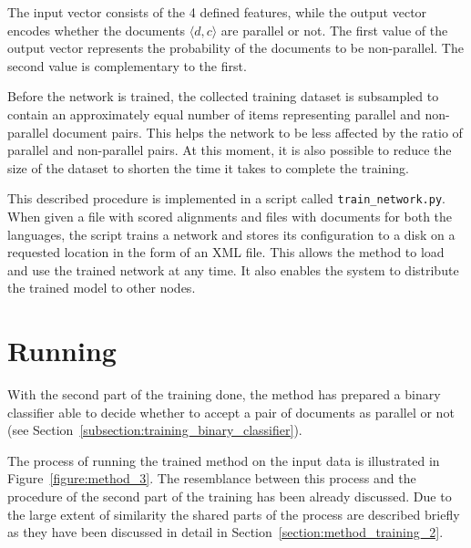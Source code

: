 The input vector consists of the 4 defined features, while the output vector encodes whether the documents $\langle d,c \rangle$ are parallel or not. The first value of the output vector represents the probability of the documents to be non-parallel. The second value is complementary to the first.

Before the network is trained, the collected training dataset is subsampled to contain an approximately equal number of items representing parallel and non-parallel document pairs. This helps the network to be less affected by the ratio of parallel and non-parallel pairs. At this moment, it is also possible to reduce the size of the dataset to shorten the time it takes to complete the training.

This described procedure is implemented in a script called \texttt{train\_network.py}. When given a file with scored alignments and files with documents for both the languages, the script trains a network and stores its configuration to a disk on a requested location in the form of an XML file. This allows the method to load and use the trained network at any time. It also enables the system to distribute the trained model to other nodes.

\section{Running}
\label{section:method_running}

With the second part of the training done, the method has prepared a binary classifier able to decide whether to accept a pair of documents as parallel or not (see Section~\ref{subsection:training_binary_classifier}).

The process of running the trained method on the input data is illustrated in Figure~\ref{figure:method_3}. The resemblance between this process and the procedure of the second part of the training has been already discussed. Due to the large extent of similarity the shared parts of the process are described briefly as they have been discussed in detail in Section~\ref{section:method_training_2}.

